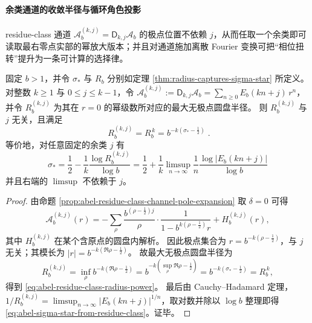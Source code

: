 \paragraph{余类通道的收敛半径与循环角色投影}
residue-class 通道 \(\mathcal A_b^{(k,j)}=\mathsf D_{k,j}\mathcal A_b\) 的极点位置不依赖 \(j\)，从而任取一个余类即可读取最右零点实部的幂放大版本；并且对通道施加离散 Fourier 变换可把“相位扭转”提升为一条可计算的选择律。

\begin{corollary}[余类通道的收敛半径与最右零点实部的幂放大读出]\label{cor:abel-residue-class-channel-radius-sigma-star}
固定 \(b>1\)，并令 \(\sigma_*\) 与 \(R_b\) 分别如定理 \ref{thm:radius-captures-sigma-star} 所定义。
对整数 \(k\ge 1\) 与 \(0\le j\le k-1\)，令 \(\mathcal A_b^{(k,j)}:=\mathsf D_{k,j}\mathcal A_b=\sum_{n\ge 0}E_b(kn+j)\,r^n\)，并令 \(R_b^{(k,j)}\) 为其在 \(r=0\) 的幂级数所对应的最大无极点圆盘半径。
则 \(R_b^{(k,j)}\) 与 \(j\) 无关，且满足
\begin{equation}\label{eq:abel-residue-class-radius-power}
\boxed{\;
R_b^{(k,j)}=R_b^{\,k}=b^{-k(\sigma_*-\frac12)}\; }.
\end{equation}
等价地，对任意固定的余类 \(j\) 有
\begin{equation}\label{eq:abel-sigma-star-from-residue-class}
\boxed{\;
\sigma_*=\frac12-\frac{1}{k}\frac{\log R_b^{(k,j)}}{\log b}
=\frac12+\frac{1}{k}\limsup_{n\to\infty}\frac{1}{n}\frac{\log\bigl|E_b(kn+j)\bigr|}{\log b}\;}
\end{equation}
并且右端的 \(\limsup\) 不依赖于 \(j\)。
\end{corollary}
\begin{proof}
由命题 \ref{prop:abel-residue-class-channel-pole-expansion} 取 \(\delta=0\) 可得
\[
\mathcal A_b^{(k,j)}(r)
=-\sum_{\rho}\frac{b^{(\rho-\frac12)j}}{\rho}\cdot\frac{1}{1-b^{k(\rho-\frac12)}r}+H_b^{(k,j)}(r),
\]
其中 \(H_b^{(k,j)}\) 在某个含原点的圆盘内解析。
因此极点集合为
\(
r=b^{-k(\rho-\frac12)}
\)，与 \(j\) 无关；其模长为 \(|r|=b^{-k(\Re\rho-\frac12)}\)。
故最大无极点圆盘半径为
\[
R_b^{(k,j)}=\inf_{\rho}b^{-k(\Re\rho-\frac12)}
=b^{-k(\sup_{\rho}\Re\rho-\frac12)}
=b^{-k(\sigma_*-\frac12)}
=R_b^{\,k},
\]
得到 \eqref{eq:abel-residue-class-radius-power}。
最后由 Cauchy--Hadamard 定理，
\(
1/R_b^{(k,j)}=\limsup_{n\to\infty}|E_b(kn+j)|^{1/n}
\)，取对数并除以 \(\log b\) 整理即得 \eqref{eq:abel-sigma-star-from-residue-class}。证毕。
\end{proof}

